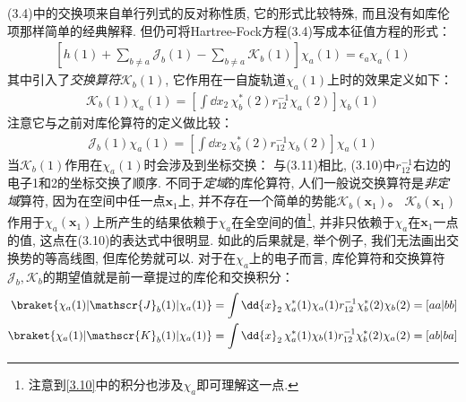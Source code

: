 (3.4)中的交换项来自单行列式的反对称性质, 它的形式比较特殊, 而且没有如库伦项那样简单的经典解释. 
但仍可将Hartree-Fock方程(3.4)写成本征值方程的形式：
\begin{align}
	\left[ h(1) + \sum_{b\neq a}\mathscr{J}_b(1) - \sum_{b\neq a}\mathscr{K}_b(1)   \right]\chi_a(1) = \epsilon_a\chi_a(1)
\end{align}
其中引入了\emph{交换算符}$\mathscr{K}_b(1)$, 
它作用在一自旋轨道$\chi_a(1)$上时的效果定义如下：
\begin{align}
	\label{3.10}
	\mathscr{K}_b(1)\chi_a(1) = \left[ \int\dd{x}_2\,\chi_b^*(2)r_{12}^{-1}\chi_a(2) \right]\chi_b(1)
\end{align}
注意它与之前对库伦算符的定义做比较：
\begin{align}
	\label{3.11}
	\mathscr{J}_b(1)\chi_a(1) = \left[ \int\dd{x}_2\,\chi_b^*(2)r_{12}^{-1}\chi_b(2) \right]\chi_a(1)
\end{align}
当$\mathscr{K}_b(1)$作用在$\chi_a(1)$时会涉及到坐标交换：
与(3.11)相比, (3.10)中$r_{12}^{-1}$右边的电子1和2的坐标交换了顺序. 
不同于\emph{定域}的库伦算符, 人们一般说交换算符是\emph{非定域}算符, 
因为在空间中任一点$\mathbf{x}_1$上, 并不存在一个简单的势能$\mathscr{K}_b(\mathbf{x}_1)$。 $\mathscr{K}_b(\mathbf{x}_1)$作用于$\chi_a(\mathbf{x}_1)$上所产生的结果依赖于$\chi_a$在全空间的值\footnote{
	注意到\autoref{3.10}中的积分也涉及$\chi_a$即可理解这一点.
}, 
并非只依赖于$\chi_a$在$\mathbf{x}_1$一点的值, 这点在(3.10)的表达式中很明显. 
如此的后果就是, 举个例子, 我们无法画出交换势的等高线图, 但库伦势就可以. 
对于在$\chi_a$上的电子而言, 库伦算符和交换算符$\mathscr{J}_b,\mathscr{K}_b$的期望值就是前一章提过的库伦和交换积分：
\begin{align}
	\braket{\chi_a(1)|\mathscr{J}_b(1)|\chi_a(1)} & = \int\dd{x}_2\,\chi_a^*(1)\chi_a(1)r_{12}^{-1}\chi_b^*(2)\chi_b(2) = [aa|bb]\\
	\braket{\chi_a(1)|\mathscr{K}_b(1)|\chi_a(1)} & = \int\dd{x}_2\,\chi_a^*(1)\chi_b(1)r_{12}^{-1}\chi_b^*(2)\chi_a(2) = [ab|ba]
\end{align}

